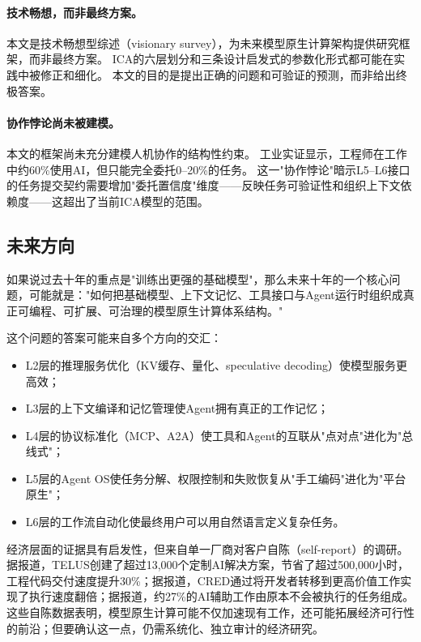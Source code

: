 \paragraph{技术畅想，而非最终方案。}
本文是技术畅想型综述（visionary survey），为未来模型原生计算架构提供研究框架，而非最终方案。
ICA的六层划分和三条设计启发式的参数化形式都可能在实践中被修正和细化。
本文的目的是提出正确的问题和可验证的预测，而非给出终极答案。

\paragraph{协作悖论尚未被建模。}
本文的框架尚未充分建模人机协作的结构性约束。
工业实证显示，工程师在工作中约60\%使用AI，但只能完全委托0--20\%的任务\cite{anthropic2026agenticreport}。
这一"协作悖论"暗示L5--L6接口的任务提交契约需要增加"委托置信度"维度——反映任务可验证性和组织上下文依赖度——这超出了当前ICA模型的范围。

\subsection{未来方向}

如果说过去十年的重点是"训练出更强的基础模型"，那么未来十年的一个核心问题，可能就是："如何把基础模型、上下文记忆、工具接口与Agent运行时组织成真正可编程、可扩展、可治理的模型原生计算体系结构。"

这个问题的答案可能来自多个方向的交汇：
\begin{itemize}[nosep]
    \item L2层的推理服务优化（KV缓存、量化、speculative decoding）使模型服务更高效；
    \item L3层的上下文编译和记忆管理使Agent拥有真正的工作记忆；
    \item L4层的协议标准化（MCP、A2A）使工具和Agent的互联从"点对点"进化为"总线式"；
    \item L5层的Agent OS使任务分解、权限控制和失败恢复从"手工编码"进化为"平台原生"；
    \item L6层的工作流自动化使最终用户可以用自然语言定义复杂任务。
\end{itemize}

经济层面的证据具有启发性，但来自单一厂商对客户自陈（self-report）的调研。据报道，TELUS创建了超过13{,}000个定制AI解决方案，节省了超过500{,}000小时，工程代码交付速度提升30\%；据报道，CRED通过将开发者转移到更高价值工作实现了执行速度翻倍；据报道，约27\%的AI辅助工作由原本不会被执行的任务组成\cite{anthropic2026agenticreport}。
这些自陈数据表明，模型原生计算可能不仅加速现有工作，还可能拓展经济可行性的前沿；但要确认这一点，仍需系统化、独立审计的经济研究。

